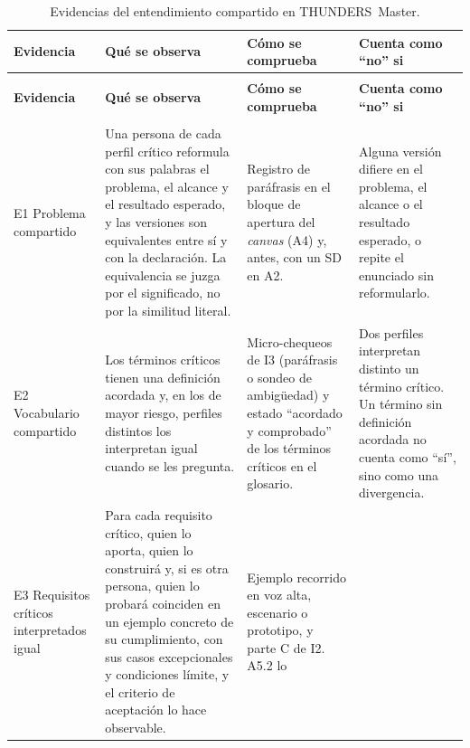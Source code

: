 \documentclass[12pt,letterpaper,oneside]{report}
\begin{document}
{\footnotesize
\setlength{\tabcolsep}{3.5pt}
\renewcommand{\arraystretch}{1.1}
\begin{xltabular}{\textwidth}{@{}>{\raggedright\arraybackslash}p{0.15\textwidth}
                                >{\raggedright\arraybackslash}X
                                >{\raggedright\arraybackslash}p{0.21\textwidth}
                                >{\raggedright\arraybackslash}p{0.22\textwidth}@{}}
\caption{Evidencias del entendimiento compartido en THUNDERS~Master.\label{tab:evidencias_final}}\\
\toprule
\textbf{Evidencia} & \textbf{Qué se observa} & \textbf{Cómo se comprueba} &
\textbf{Cuenta como ``no'' si} \\
\midrule
\endfirsthead
{}\\
\toprule
\textbf{Evidencia} & \textbf{Qué se observa} & \textbf{Cómo se comprueba} &
\textbf{Cuenta como ``no'' si} \\
\midrule
\endhead
\midrule
{}\\
\endfoot
\bottomrule
\endlastfoot
E1 Problema compartido
& Una persona de cada perfil crítico reformula con sus palabras el
  problema, el alcance y el resultado esperado, y las versiones son
  equivalentes entre sí y con la declaración. La equivalencia se juzga por el
  significado, no por la similitud literal.
& Registro de paráfrasis en el bloque de apertura del \textit{canvas} (A4) y,
  antes, con un SD en A2.
& Alguna versión difiere en el problema, el alcance o el resultado esperado, o
  repite el enunciado sin reformularlo. \\
\addlinespace
E2 Vocabulario compartido
& Los términos críticos tienen una definición acordada y, en los de mayor
  riesgo, perfiles distintos los interpretan igual cuando se les pregunta.
& Micro-chequeos de I3 (paráfrasis o sondeo de ambigüedad) y estado
  ``acordado y comprobado'' de los términos críticos en el glosario.
& Dos perfiles interpretan distinto un término crítico. Un término sin
  definición acordada no cuenta como ``sí'', sino como una divergencia. \\
\addlinespace
E3 Requisitos críticos interpretados igual
& Para cada requisito crítico, quien lo aporta, quien lo construirá y, si es otra persona, quien lo probará coinciden en un ejemplo concreto de su
  cumplimiento, con sus casos excepcionales y condiciones límite, y el criterio
  de aceptación lo hace observable.
& Ejemplo recorrido en voz alta, escenario o prototipo, y parte C de I2. A5.2 lo

\end{xltabular}}
\end{document}
